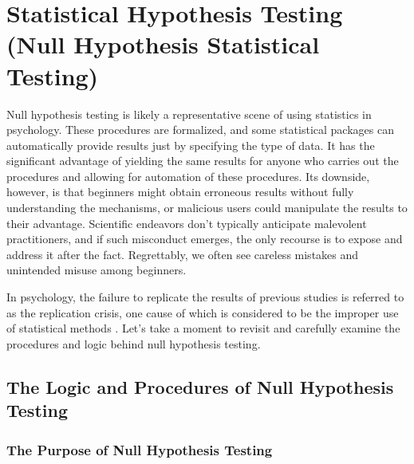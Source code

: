 \documentclass[
  a4paper,
]{book}
\begin{document}
\chapter{Statistical Hypothesis Testing (Null Hypothesis Statistical
Testing)}\label{statistical-hypothesis-testing-null-hypothesis-statistical-testing}

Null hypothesis testing is likely a representative scene of using
statistics in psychology. These procedures are formalized, and some
statistical packages can automatically provide results just by
specifying the type of data. It has the significant advantage of
yielding the same results for anyone who carries out the procedures and
allowing for automation of these procedures. Its downside, however, is
that beginners might obtain erroneous results without fully
understanding the mechanisms, or malicious users could manipulate the
results to their advantage. Scientific endeavors don't typically
anticipate malevolent practitioners, and if such misconduct emerges, the
only recourse is to expose and address it after the fact. Regrettably,
we often see careless mistakes and unintended misuse among beginners.

In psychology, the failure to replicate the results of previous studies
is referred to as the replication crisis, one cause of which is
considered to be the improper use of statistical methods
\autocite{Ikeda2016}. Let's take a moment to revisit and carefully
examine the procedures and logic behind null hypothesis testing.

\section{The Logic and Procedures of Null Hypothesis
Testing}\label{the-logic-and-procedures-of-null-hypothesis-testing}

\subsection{The Purpose of Null Hypothesis
Testing}\label{the-purpose-of-null-hypothesis-testing}
\end{document}
